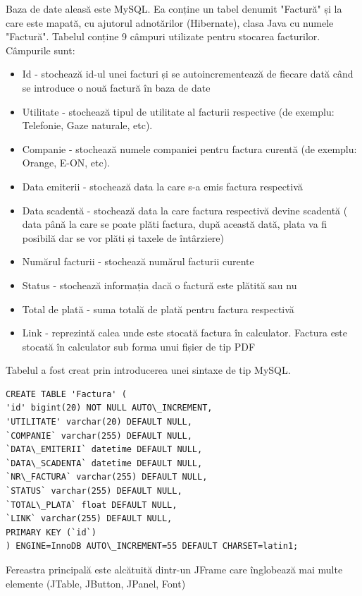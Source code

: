 \documentclass[12pt]{book}
\begin{document}
Baza de date aleasă este MySQL. Ea conține un tabel denumit "Factură" și la care este mapată, cu ajutorul adnotărilor (Hibernate), clasa Java cu numele "Factură". Tabelul conține 9 câmpuri utilizate pentru stocarea facturilor. Câmpurile sunt:
\begin{addmargin}[4em]{1em}
	\begin{itemize}
		\item Id - stochează id-ul unei facturi și se autoincrementează de fiecare dată când se introduce o nouă factură în baza de date
		\item Utilitate - stochează tipul de utilitate al facturii respective (de exemplu: Telefonie, Gaze naturale, etc).
		\item Companie - stochează numele companiei pentru factura curentă (de exemplu: Orange, E-ON, etc).
		\item Data emiterii - stochează data la care s-a emis factura respectivă
		\item Data scadentă - stochează data la care factura respectivă devine scadentă ( data până la care se poate plăti factura, după această dată, plata va fi posibilă dar se vor plăti și taxele de întârziere)
		\item Numărul facturii - stochează numărul facturii curente
		\item Status - stochează informația dacă o factură este plătită sau nu
		\item Total de plată - suma totală de plată pentru factura respectivă
		\item Link - reprezintă calea unde este stocată factura în calculator. Factura este stocată în calculator sub forma unui fișier de tip PDF
	\end{itemize}
\end{addmargin}

Tabelul a fost creat prin introducerea unei sintaxe de tip MySQL.
\begin{lstlisting}[frame=single, caption=Crearea tabelului bazei de date]
CREATE TABLE 'Factura' (
'id' bigint(20) NOT NULL AUTO\_INCREMENT,
'UTILITATE' varchar(20) DEFAULT NULL,
`COMPANIE` varchar(255) DEFAULT NULL,
`DATA\_EMITERII` datetime DEFAULT NULL,
`DATA\_SCADENTA` datetime DEFAULT NULL,
`NR\_FACTURA` varchar(255) DEFAULT NULL,
`STATUS` varchar(255) DEFAULT NULL,
`TOTAL\_PLATA` float DEFAULT NULL,
`LINK` varchar(255) DEFAULT NULL,
PRIMARY KEY (`id`)
) ENGINE=InnoDB AUTO\_INCREMENT=55 DEFAULT CHARSET=latin1;
\end{lstlisting}

Fereastra principală este alcătuită dintr-un JFrame care înglobează mai multe elemente (JTable, JButton, JPanel, Font)
\end{document}
